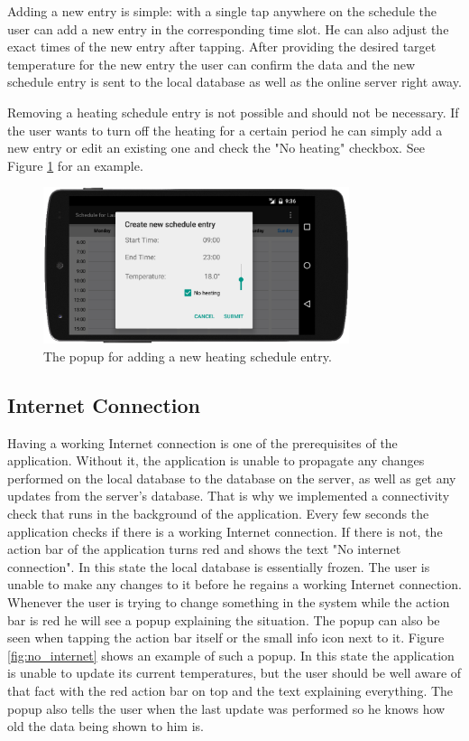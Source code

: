 Adding a new entry is simple: with a single tap anywhere on the schedule the user can add a new entry in the corresponding time slot. He can also adjust the exact times of the new entry after tapping. After providing the desired target temperature for the new entry the user can confirm the data and the new schedule entry is sent to the local database as well as the online server right away. 

Removing a heating schedule entry is not possible and should not be necessary. If the user wants to turn off the heating for a certain period he can simply add a new entry or edit an existing one and check the "No heating" checkbox. See Figure \ref{fig:new_schedule_entry} for an example.

\begin{figure}
	\begin{center}
		\includegraphics[width=0.8\textwidth]{images/new_schedule_entry.png}
	\end{center}
	\caption{The popup for adding a new heating schedule entry.}
	\label{fig:new_schedule_entry}
\end{figure}

\subsection{Internet Connection}

Having a working Internet connection is one of the prerequisites of the application. Without it, the application is unable to propagate any changes performed on the local database to the database on the server, as well as get any updates from the server's database. That is why we implemented a connectivity check that runs in the background of the application. Every few seconds the application checks if there is a working Internet connection.
If there is not, the action bar of the application turns red and shows the text "No internet connection". In this state the local database is essentially frozen. The user is unable to make any changes to it before he regains a working Internet connection. Whenever the user is trying to change something in the system while the action bar is red he will see a popup explaining the situation.
The popup can also be seen when tapping the action bar itself or the small info icon next to it. Figure \ref{fig:no_internet} shows an example of such a popup. In this state the application is unable to update its current temperatures, but the user should be well aware of that fact with the red action bar on top and the text explaining everything. The popup also tells the user when the last update was performed so he knows how old the data being shown to him is. 

